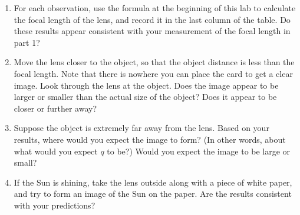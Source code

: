 \begin{enumerate}
\vskip 1in

\item For each observation, use the formula at the beginning
of this lab to calculate the focal length of the lens, and record
it in the last column of the table.  Do these results appear consistent
with your measurement of the focal length in part 1?

\vskip 1in

\item Move the lens closer to the object, so that the object distance
is less than the focal length.  Note that there is nowhere you can
place the card to get a clear image.  Look through the lens at the
object.  Does the image appear to be larger or smaller than the actual
size of the object?  Does it appear to be closer or further away?

\vskip 1in

\item Suppose the object is extremely far away from the lens.
Based on your results, where would you expect the image to form?
(In other words, about what would you expect $q$ to be?)  Would
you expect the image to be large or small?

\vskip 1in

\item If the Sun is shining, take the lens outside along with
a piece of white paper, and try to form an image of the Sun on the
paper.  Are the results consistent with your predictions?

\vskip 1in

\end{enumerate}


